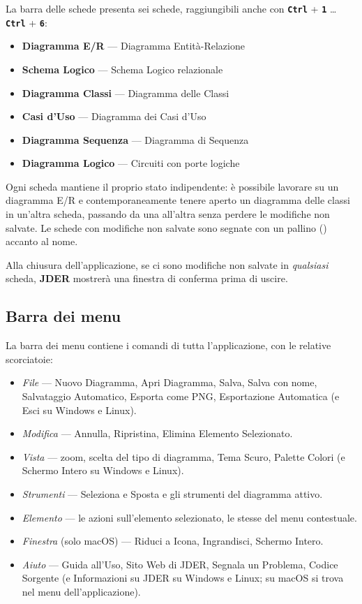 \documentclass[a4paper,11pt]{article}
\newcommand{\key}[1]{\texttt{\textbf{#1}}}
\newcommand{\menu}[1]{\textit{#1}}
\newcommand{\uielement}[1]{\textbf{#1}}
\newcommand{\jder}{\textbf{JDER}}
\begin{document}
La barra delle schede presenta sei schede, raggiungibili anche con \key{Ctrl} + \key{1}
\ldots{} \key{Ctrl} + \key{6}:

\begin{itemize}
  \item \uielement{Diagramma E/R} --- Diagramma Entità-Relazione
  \item \uielement{Schema Logico} --- Schema Logico relazionale
  \item \uielement{Diagramma Classi} --- Diagramma delle Classi
  \item \uielement{Casi d'Uso} --- Diagramma dei Casi d'Uso
  \item \uielement{Diagramma Sequenza} --- Diagramma di Sequenza
  \item \uielement{Diagramma Logico} --- Circuiti con porte logiche
\end{itemize}

Ogni scheda mantiene il proprio stato indipendente: è possibile lavorare su un diagramma E/R e
contemporaneamente tenere aperto un diagramma delle classi in un'altra scheda, passando da una
all'altra senza perdere le modifiche non salvate. Le schede con modifiche non salvate sono
segnate con un pallino (\textbullet) accanto al nome.

\begin{tcolorbox}[notebox, title={Nota}]
  Alla chiusura dell'applicazione, se ci sono modifiche non salvate in \emph{qualsiasi} scheda,
  \jder{} mostrerà una finestra di conferma prima di uscire.
\end{tcolorbox}

\subsection{Barra dei menu}

La barra dei menu contiene i comandi di tutta l'applicazione, con le relative scorciatoie:

\begin{itemize}
  \item \menu{File} --- Nuovo Diagramma, Apri Diagramma, Salva, Salva con nome, Salvataggio
        Automatico, Esporta come PNG, Esportazione Automatica (e Esci su Windows e Linux).
  \item \menu{Modifica} --- Annulla, Ripristina, Elimina Elemento Selezionato.
  \item \menu{Vista} --- zoom, scelta del tipo di diagramma, Tema Scuro, Palette Colori (e Schermo
        Intero su Windows e Linux).
  \item \menu{Strumenti} --- Seleziona e Sposta e gli strumenti del diagramma attivo.
  \item \menu{Elemento} --- le azioni sull'elemento selezionato, le stesse del menu contestuale.
  \item \menu{Finestra} (solo macOS) --- Riduci a Icona, Ingrandisci, Schermo Intero.
  \item \menu{Aiuto} --- Guida all'Uso, Sito Web di JDER, Segnala un Problema, Codice Sorgente (e
        Informazioni su JDER su Windows e Linux; su macOS si trova nel menu dell'applicazione).
\end{itemize}
\end{document}
